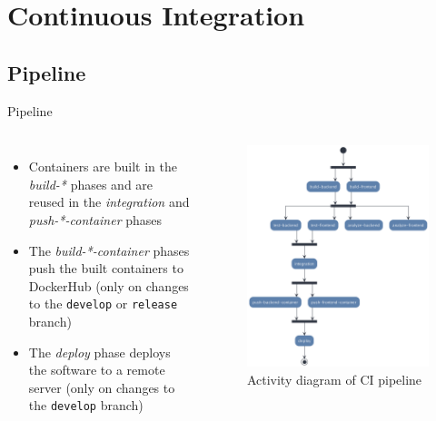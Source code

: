 \documentclass{beamer}
\begin{document}
\section{Continuous Integration}
\subsection{Pipeline}
\begin{frame}{Pipeline}
  \begin{columns}
    \begin{itemize}
      \item Containers are built in the \textit{build-*} phases and are reused in the \textit{integration} and \textit{push-*-container} phases
      \item The \textit{build-*-container} phases push the built containers to DockerHub (only on changes to the \texttt{develop} or \texttt{release} branch)
      \item The \textit{deploy} phase deploys the software to a remote server (only on changes to the \texttt{develop} branch)
    \end{itemize}
    \begin{figure}
      \begin{center}
        \includegraphics[scale=0.09]{ci_activity}
        \caption{Activity diagram of CI pipeline}
      \end{center}
    \end{figure}
  \end{columns}
\end{frame}
\end{document}
